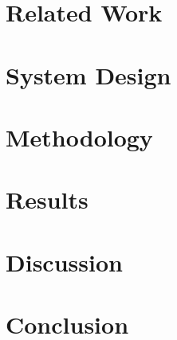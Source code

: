 \documentclass[conference]{IEEEtran}
\begin{document}
{%

\section{Related Work}
\label{sec:related}

{%

\section{System Design}
\label{sec:design}

{%

\section{Methodology}
\label{sec:methodology}

{%

\section{Results}
\label{sec:results}

{%

\section{Discussion}
\label{sec:discussion}

{%

\section{Conclusion}
\label{sec:conclusion}

}}}}}}
\end{document}
